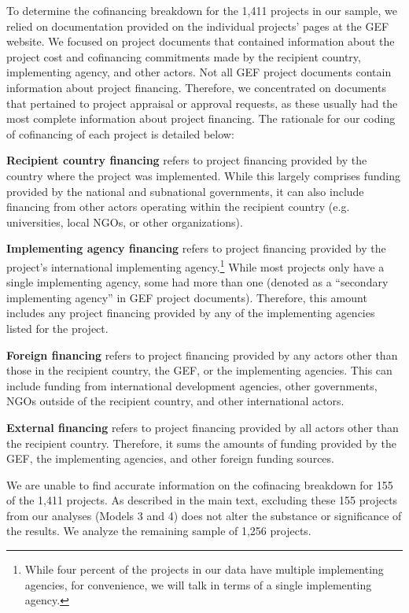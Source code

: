 \documentclass{article}
\begin{document}
To determine the cofinancing breakdown for the 1,411 projects in our sample, we relied on documentation provided on the individual projects’ pages at the GEF website.  We focused on project documents that contained information about the project cost and cofinancing commitments made by the recipient country, implementing agency, and other actors.  Not all GEF project documents contain information about project financing.  Therefore, we concentrated on documents that pertained to project appraisal or approval requests, as these usually had the most complete information about project financing. The rationale for our coding of cofinancing of each project is detailed below:

\textbf{Recipient country financing} refers to project financing provided by the country where the project was implemented. While this largely comprises funding provided by the national and subnational governments, it can also include financing from other actors operating within the recipient country (e.g. universities, local NGOs, or other organizations).

\textbf{Implementing agency financing} refers to project financing provided by the project’s international implementing agency.\footnote{While four percent of the projects in our data have multiple implementing agencies, for convenience, we will talk in terms of a single implementing agency.}  While most projects only have a single implementing agency, some had more than one (denoted as a “secondary implementing agency” in GEF project documents). Therefore, this amount includes any project financing provided by any of the implementing agencies listed for the project.

\textbf{Foreign financing} refers to project financing provided by any actors other than those in the recipient country, the GEF, or the implementing agencies. This can include funding from international development agencies, other governments, NGOs outside of the recipient country, and other international actors.

\textbf{External financing} refers to project financing provided by all actors other than the recipient country. Therefore, it sums the amounts of funding provided by the GEF, the implementing agencies, and other foreign funding sources.

We are unable to find accurate information on the cofinacing breakdown for 155 of the 1,411 projects. As described in the main text, excluding these 155 projects from our analyses (Models 3 and 4) does not alter the substance or significance of the results. We analyze the remaining sample of 1,256 projects.
\end{document}
